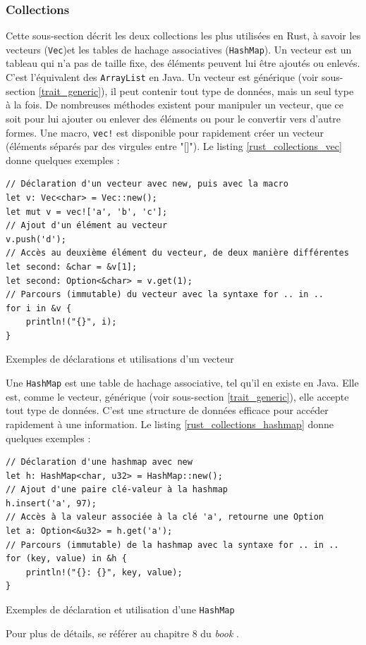 \documentclass[a4paper, 12pt]{article}
\newenvironment{code}{\captionsetup{type=listing}}{}
\begin{document}
\subsubsection{Collections}\label{rust_collections}
Cette sous-section décrit les deux collections les plus utilisées en Rust, à savoir les vecteurs 
(\texttt{Vec})et les tables de 
hachage associatives (\texttt{HashMap}). Un vecteur est un tableau qui n'a pas de taille 
fixe, des éléments peuvent lui être ajoutés ou enlevés. C'est l'équivalent des \texttt{ArrayList} 
en Java. Un vecteur est générique (voir sous-section \ref{trait_generic}), il peut contenir tout type 
de données, mais un seul type à la fois. 
De nombreuses méthodes existent pour manipuler un vecteur, que ce soit pour lui ajouter ou enlever 
des éléments ou pour le convertir vers d'autre formes. Une macro, \texttt{vec!} est 
disponible pour rapidement créer un vecteur (éléments séparés par des virgules entre "[]").
Le listing \ref{rust_collections_vec} donne quelques exemples :
\bigbreak
\begin{code}
    \begin{verbatim}
// Déclaration d'un vecteur avec new, puis avec la macro
let v: Vec<char> = Vec::new();
let mut v = vec!['a', 'b', 'c'];
// Ajout d'un élément au vecteur
v.push('d');
// Accès au deuxième élément du vecteur, de deux manière différentes
let second: &char = &v[1];
let second: Option<&char> = v.get(1);
// Parcours (immutable) du vecteur avec la syntaxe for .. in ..
for i in &v {
    println!("{}", i);
}
    \end{verbatim}
    \caption{Exemples de déclarations et utilisations d'un vecteur}
    \label{rust_collections_vec}
\end{code}
\bigbreak
Une \texttt{HashMap} est une table de hachage associative, tel qu'il en existe en Java.
Elle est, comme le vecteur, générique (voir sous-section \ref{trait_generic}), elle accepte tout 
type de données. C'est une structure de données efficace pour accéder rapidement à une information.
Le listing \ref{rust_collections_hashmap} donne quelques exemples :
\bigbreak
\begin{code}
    \begin{verbatim}
// Déclaration d'une hashmap avec new
let h: HashMap<char, u32> = HashMap::new();
// Ajout d'une paire clé-valeur à la hashmap
h.insert('a', 97);
// Accès à la valeur associée à la clé 'a', retourne une Option
let a: Option<&u32> = h.get('a');
// Parcours (immutable) de la hashmap avec la syntaxe for .. in ..
for (key, value) in &h {
    println!("{}: {}", key, value);
}
    \end{verbatim}
    \caption{Exemples de déclaration et utilisation d'une \texttt{HashMap}}
    \label{rust_collections_hashmap}
\end{code}
\bigbreak
Pour plus de détails, se référer au chapitre 8 du \textit{book} \cite{ref0}.
\end{document}
